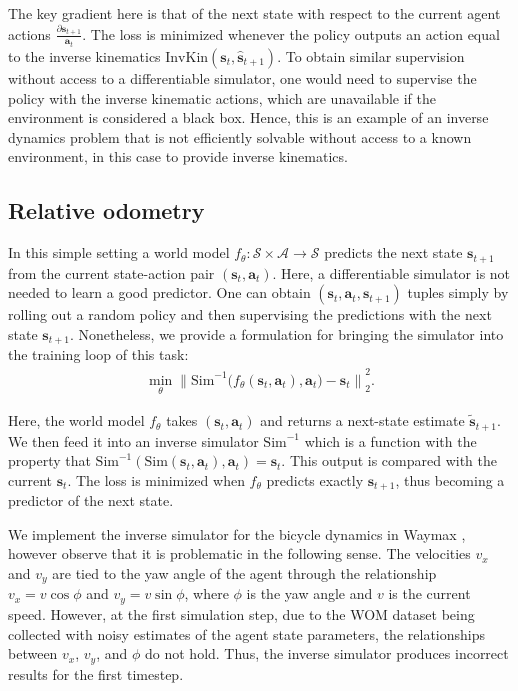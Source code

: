 The key gradient here is that of the next state with respect to the current agent actions $\frac{\partial \mathbf{s}_{t+1}}{\mathbf{a}_t}$. The loss is minimized whenever the policy outputs an action equal to the inverse kinematics $\text{InvKin}(\mathbf{s}_t , \hat{\mathbf{s}}_{t+1})$. To obtain similar supervision without access to a differentiable simulator, one would need to supervise the policy with the inverse kinematic actions, which are unavailable if the environment is considered a black box. Hence, this is an example of an inverse dynamics problem that is not efficiently solvable without access to a known environment, in this case to provide inverse kinematics.

\subsection{Relative odometry}
\label{subsection: dynamics}

In this simple setting a world model $f_\theta : \mathcal{S} \times \mathcal{A} \rightarrow \mathcal{S}$ predicts the next state $\mathbf{s}_{t+1}$ from the current state-action pair $(\mathbf{s}_t, \mathbf{a}_t)$. Here, a differentiable simulator is not needed to learn a good predictor. One can obtain $(\mathbf{s}_t, \mathbf{a}_t, \mathbf{s}_{t+1})$ tuples simply by rolling out a random policy and then supervising the predictions with the next state $\mathbf{s}_{t+1}$. Nonetheless, we provide a formulation for bringing the simulator into the training loop of this task:
\begin{equation} \label{eq:world_model_with_inverse}
\begin{aligned}
\min_\theta {\Big\lVert \text{Sim}^{-1} \big(f_\theta(\mathbf{s}_t, \mathbf{a}_t), \mathbf{a}_t \big) - \mathbf{s}_{t} \Big\rVert}_2^2.
\end{aligned}
\end{equation}

Here, the world model $f_\theta$ takes $(\mathbf{s}_{t}, \mathbf{a}_t)$ and returns a next-state estimate $\tilde{\mathbf{s}}_{t+1}$. We then feed it into an inverse simulator $\text{Sim}^{-1}$ which is a function with the property that $\text{Sim}^{-1}( \text{Sim}(\mathbf{s}_t, \mathbf{a}_t), \mathbf{a}_t) = \mathbf{s}_t$. This output is compared with the current $\mathbf{s}_t$. The loss is minimized when $f_\theta$ predicts exactly $\mathbf{s}_{t+1}$, thus becoming a predictor of the next state.

We implement the inverse simulator for the bicycle dynamics in Waymax \cite{gulino2024waymax}, however observe that it is problematic in the following sense. The velocities $v_x$ and $v_y$ are tied to the yaw angle of the agent through the relationship $v_x = v \cos \phi$ and $v_y = v \sin \phi$, where $\phi$ is the yaw angle and $v$ is the current speed. However, at the first simulation step, due to the WOM dataset \cite{ettinger2021large} being collected with noisy estimates of the agent state parameters, the relationships between $v_x$, $v_y$, and $\phi$ do not hold. Thus, the inverse simulator produces incorrect results for the first timestep.

